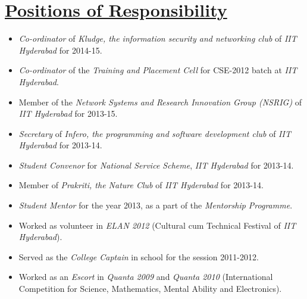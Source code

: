\documentclass[8pt]{extarticle}
\newcommand{\heading}[1]{
\section*{\color{red}\underline{#1}}
}
\begin{document}
\heading{Positions of Responsibility}
\begin{itemize}
\item \textit{Co-ordinator} of \textit{Kludge, the information security and networking club} of \textit{IIT Hyderabad} for 2014-15.
\item \textit{Co-ordinator} of the \textit{Training and Placement Cell} for CSE-2012 batch at \textit{IIT Hyderabad}.
\item Member of the \textit{Network Systems and Research Innovation Group (NSRIG)} of \textit{IIT Hyderabad} for 2013-15.
\item \textit{Secretary} of \textit{Infero, the programming and software development club} of \textit{IIT Hyderabad} for 2013-14.
\item \textit{Student Convenor} for \textit{National Service Scheme}, \textit{IIT Hyderabad} for 2013-14.
\item Member of \textit{Prakriti, the Nature Club} of \textit{IIT Hyderabad} for 2013-14.
\item \textit{Student Mentor} for the year 2013, as a part of the \textit{Mentorship Programme}.
\item Worked as volunteer in \textit{ELAN 2012} (Cultural cum Technical Festival of \textit{IIT Hyderabad}).
\item Served as the \textit{College Captain} in school for the session 2011-2012.
\item Worked as an \textit{Escort} in \textit{Quanta 2009} and \textit{Quanta 2010} (International Competition for Science, Mathematics, Mental Ability and Electronics).
\end{itemize}
\end{document}
